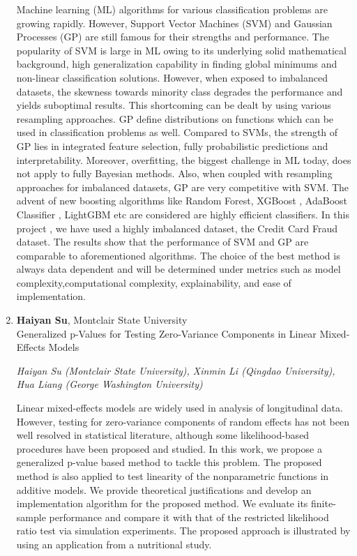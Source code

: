 \begin{enumerate}
Machine learning (ML) algorithms for various classification problems are growing rapidly. However, Support Vector Machines (SVM)  and Gaussian Processes (GP) are still famous for their strengths and performance. The popularity of SVM  is large in  ML owing to its underlying solid mathematical background, high generalization capability in finding  global minimums and non-linear classification solutions. However, when exposed to imbalanced datasets, the skewness towards minority class degrades the performance and yields suboptimal results. This shortcoming can be dealt by using various resampling approaches. GP define distributions on functions which can be used in classification problems as well. Compared to SVMs, the strength of GP lies in integrated feature selection, fully probabilistic predictions and interpretability. Moreover, overfitting, the biggest challenge in ML today, does not apply to fully Bayesian methods. Also, when coupled with resampling approaches for imbalanced datasets, GP are very competitive with SVM. The advent of new  boosting algorithms like Random Forest, XGBoost , AdaBoost Classifier , LightGBM etc are considered are highly efficient classifiers. In this project , we have used a highly imbalanced dataset, the Credit Card Fraud dataset. The results  show that the performance of SVM and GP are comparable to aforementioned algorithms. The choice of the best method is always data dependent and will be determined under metrics such as model complexity,computational complexity, explainability, and ease of implementation.

\item \textbf{Haiyan Su}, Montclair State University \\
Generalized p-Values for Testing Zero-Variance Components in Linear Mixed-Effects Models

\emph{\footnotesize Haiyan Su (Montclair State University), Xinmin Li (Qingdao University), Hua Liang (George Washington University)}

Linear mixed-effects models are widely used in analysis of longitudinal data. However, testing for zero-variance components of random effects has not been well resolved in statistical literature, although some likelihood-based procedures have been proposed and studied. In this work, we propose a generalized p-value based method to tackle this problem.  The proposed method is also applied to test linearity of the nonparametric functions in additive models. We provide theoretical justifications and develop an implementation algorithm for the proposed method. We evaluate its finite-sample performance and compare it with that of the restricted likelihood ratio test via simulation experiments. The proposed approach is illustrated by using an application from a nutritional study.


\end{enumerate}

